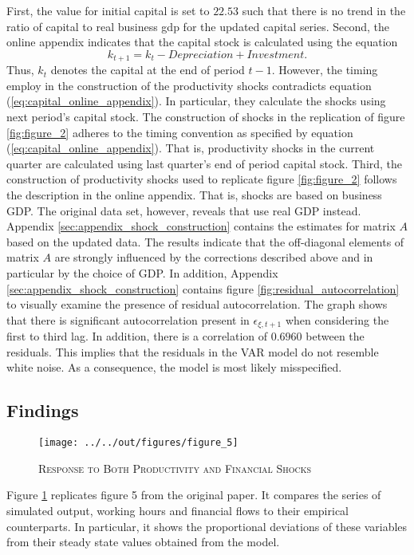 First, the value for initial capital is set to $22.53$ such that there is no trend in the ratio of capital to real business gdp for the updated capital series. Second, the online appendix indicates that the capital stock is calculated using the equation
\begin{equation} 
	\label{eq:capital_online_appendix}
	k_{t+1} = k_{t} - Depreciation + Investment.
\end{equation} 
Thus, ${k}_t$ denotes the capital at the end of period $t-1$. However, the timing \citeauthor{JERMANNfinancial} employ in the construction of the productivity shocks contradicts equation (\ref{eq:capital_online_appendix}). In particular, they  calculate the shocks using next period's capital stock. The construction of shocks in the replication of figure \ref{fig:figure_2} adheres to the timing convention as specified by equation (\ref{eq:capital_online_appendix}). That is, productivity shocks in the current quarter are calculated using last quarter's end of period capital stock. Third, the construction of productivity shocks used to replicate figure \ref{fig:figure_2} follows the description in the online appendix. That is, shocks are based on business GDP. The original data set, however, reveals that \citeauthor{JERMANNfinancial} use real GDP instead. 
Appendix \ref{sec:appendix_shock_construction} contains the estimates for matrix $A$ based on the updated data. The results indicate that the off-diagonal elements of matrix $A$ are strongly influenced by the corrections described above and in particular by the choice of GDP. In addition, Appendix \ref{sec:appendix_shock_construction} contains figure \ref{fig:residual_autocorrelation} to visually examine the presence of residual autocorrelation. The graph shows that there is significant autocorrelation present in ${\epsilon}_{\xi,t+1}$ when considering the first to third lag. In addition, there is a correlation of $0.6960$ between the residuals. This implies that the residuals in the VAR model do not resemble white noise. As a consequence, the model is most likely misspecified.


\subsection{Findings}
\label{sec:findings}

\begin{figure}[t]
	\begin{center}
	    \texttt{[image: ../../out/figures/figure\_5]}
	    \caption{\textsc{Response to Both Productivity and Financial Shocks}}
	    \label{fig:figure_5}
    \end{center}
\end{figure}

Figure \ref{fig:figure_5} replicates figure 5 from the original paper. It compares  the series of simulated output, working hours and financial flows to their empirical counterparts. In particular, it shows the proportional deviations of these variables from their steady state values obtained from the model.

